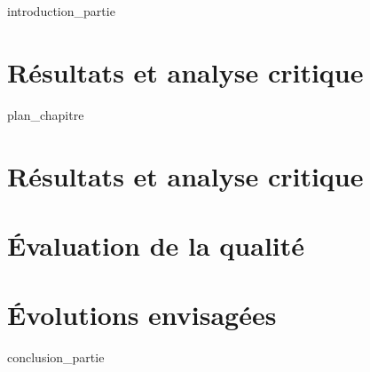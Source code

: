 \label{part:01_int}
{introduction_partie}
%
\chapter{Résultats et analyse critique }
\label{chap:09}
{plan_chapitre}
%
\chapter{Résultats et analyse critique }
\label{chap:10}
%
\chapter{Évaluation de la qualité }
\label{chap:11}
%
\chapter{Évolutions envisagées }
\label{chap:12}
%
\label{part:01_cnc}
{conclusion_partie}
